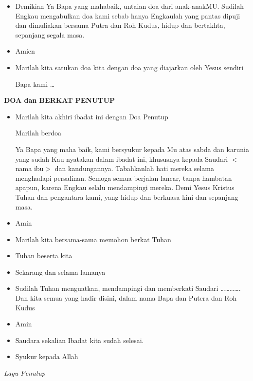 \documentclass[a5paper,headsepline,titlepage,10pt,nnormalheadings,DIVcalc,twoside]{scrbook}
\makeatletter
\newcommand{\subjudul}[1]{%
  {\parindent \z@ 
    \interlinepenalty\@M \bfseries #1\par\nobreak \vskip 10\p@ }}
\newcommand{\lagu}[1]{%
  {\parindent \z@ 
    \interlinepenalty\@M \slshape \mdseries \Large \textit{#1}\par\nobreak \vskip 10\p@ }}
\newcommand{\BU}[1]{\begin{itemize} \item[U:] #1 \end{itemize}}
\newcommand{\BP}[1]{\begin{itemize} \item[P:] #1 \end{itemize}}
\newcommand{\namaibu}{$<$nama ibu$>$ }
\makeatother
\begin{document}
\BP{Demikian Ya Bapa yang mahabaik, untaian doa dari anak-anakMU. Sudilah Engkau mengabulkan doa kami sebab hanya Engkaulah yang pantas dipuji dan dimuliakan bersama Putra dan Roh Kudus, hidup dan bertakhta, sepanjang segala masa.}

\BU{Amien}

\BP{Marilah kita satukan doa kita dengan doa yang diajarkan oleh Yesus sendiri

Bapa kami \dots}



\subjudul{DOA dan BERKAT PENUTUP}
\BP{Marilah kita akhiri ibadat ini dengan Doa Penutup

Marilah berdoa

Ya Bapa yang maha baik, kami bersyukur kepada Mu atas sabda dan karunia yang sudah Kau nyatakan dalam ibadat ini, khususnya kepada Saudari \namaibu dan kandungannya. Tabahkanlah hati mereka selama menghadapi persalinan. Semoga semua berjalan lancar, tanpa hambatan apapun, karena Engkau selalu mendampingi mereka. Demi Yesus Kristus Tuhan dan pengantara kami, yang hidup dan berkuasa kini dan sepanjang masa.}

\BU{Amin}

\BP{Marilah kita bersama-sama memohon berkat Tuhan}

\BP{Tuhan beserta kita}
\BU{Sekarang dan selama lamanya}
\BP{Sudilah Tuhan menguatkan, mendampingi dan memberkati Saudari …………. Dan kita semua yang hadir disini, dalam nama Bapa dan Putera dan Roh Kudus}
\BU{Amin}
\BP{Saudara sekalian Ibadat kita sudah selesai.}
\BU{Syukur kepada Allah}



\lagu{Lagu Penutup}
\end{document}

